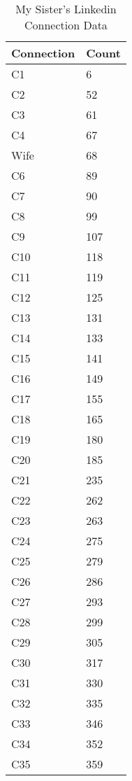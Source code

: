 \begin{table}[!htbp]
	\caption{My Sister's Linkedin Connection Data} \label{tab:table3}
	\small
	\begin{center}
	\vspace{-5mm}
	\begin{minipage}{0.30\textwidth}
		\begin{tabular}{|l | l|}
			\hline
			\multicolumn{1}{|c|}{Connection} & \multicolumn{1}{c|}{Count}\\
			\hline
			C1 & 6\\
			C2 & 52\\
			C3 & 61\\
			C4 & 67\\
			Wife & 68\\
			C6 & 89\\
			C7 & 90\\
			C8 & 99\\
			C9 & 107\\
			C10 & 118\\
			C11 & 119\\
			C12 & 125\\
			C13 & 131\\
			C14 & 133\\
			C15 & 141\\
			C16 & 149\\
			C17 & 155\\
			C18 & 165\\
			C19 & 180\\
			C20 & 185\\
			C21 & 235\\
			C22 & 262\\
			C23 & 263\\
			C24 & 275\\
			C25 & 279\\
			C26 & 286\\
			C27 & 293\\
			C28 & 299\\
			C29 & 305\\
			C30 & 317\\
			C31 & 330\\
			C32 & 335\\
			C33 & 346\\
			C34 & 352\\
			C35 & 359\\

\end{tabular}
\end{minipage}
\end{center}
\end{table}
